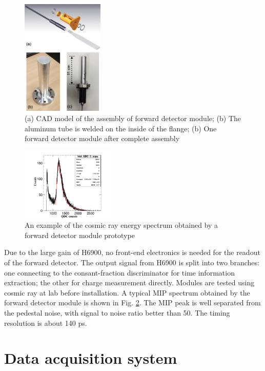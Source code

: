 \documentclass[number,5p]{elsarticle}
\begin{document}
\begin{figure}[htbp]
\centering
\includegraphics[width=0.35\textwidth]{./forward_module.png}
\caption{(a) CAD model of the assembly of forward detector module; (b) The aluminum tube is welded on the inside of the flange; (b) One forward detector module after complete assembly}
\label{fig:forward_module}
\end{figure}

\begin{figure}[htbp]
\centering
\includegraphics[width=0.4\textwidth]{./forward_mip.pdf}
\caption{An example of the cosmic ray energy spectrum obtained by a forward detector module prototype}
\label{fig:forward_mip}
\end{figure}

Due to the large gain of H6900, no front-end electronics is needed for the readout of the forward detector.
The output signal from H6900 is split into two branches: one connecting to the
consant-fraction discriminator for time information extraction; the other for charge measurement directly.
Modules are tested using cosmic ray at lab before installation.
A typical MIP spectrum obtained by the forward detector module is shown in Fig. \ref{fig:forward_mip}. 
The MIP peak is well separated from the pedestal noise, with signal to noise ratio better than 50.
The timing resolution is about 140 ps.

\section{Data acquisition system}
\label{sec:daq}
\end{document}
